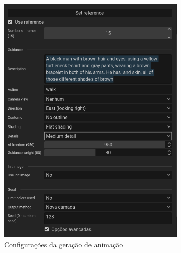 \begin{figure}[htbp]
    \centering
    \caption{\small Processo da utilização 6 da ferramenta de animação do PixelLab em julho/2025}
    \label{fig:pixelLabAnimacao6}

    \begin{subfigure}{0.6\linewidth}
        \includegraphics[width=1\linewidth]{figs/pixelLab/dia3/tela_7.PNG}
        \caption{\small Configurações da geração de animação}
        \label{fig:pixelLabAnimacao6a}
    \end{subfigure}
    \begin{subfigure}{0.35\linewidth}

\end{subfigure}
\end{figure}
